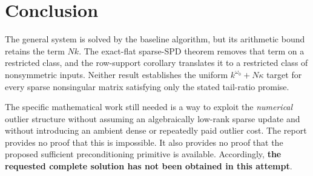 \documentclass[11pt,a4paper]{article}
\theoremstyle{definition}
\theoremstyle{remark}
\begin{document}
\section{Conclusion}
The general system is solved by the baseline algorithm, but its arithmetic bound retains the term $Nk$. The exact-flat sparse-SPD theorem removes that term on a restricted class, and the row-support corollary translates it to a restricted class of nonsymmetric inputs. Neither result establishes the uniform $k^{\omega_0}+N\kappa$ target for every sparse nonsingular matrix satisfying only the stated tail-ratio promise.

The specific mathematical work still needed is a way to exploit the \emph{numerical} outlier structure without assuming an algebraically low-rank sparse update and without introducing an ambient dense or repeatedly paid outlier cost. The report provides no proof that this is impossible. It also provides no proof that the proposed sufficient preconditioning primitive is available. Accordingly, \textbf{the requested complete solution has not been obtained in this attempt}.
\end{document}
